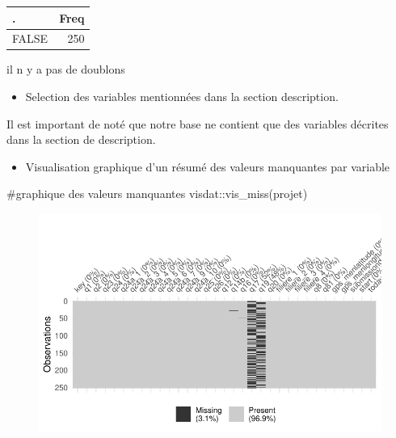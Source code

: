 \documentclass[
  letterpaper,
  DIV=11,
  numbers=noendperiod]{scrartcl}
\newenvironment{Shaded}{\begin{snugshade}}{\end{snugshade}}
\newcommand{\CommentTok}[1]{\textcolor[rgb]{0.37,0.37,0.37}{#1}}
\newcommand{\FunctionTok}[1]{\textcolor[rgb]{0.28,0.35,0.67}{#1}}
\newcommand{\NormalTok}[1]{\textcolor[rgb]{0.00,0.23,0.31}{#1}}
\newcommand{\SpecialCharTok}[1]{\textcolor[rgb]{0.37,0.37,0.37}{#1}}
\providecommand{\tightlist}{%
  \setlength{\itemsep}{0pt}\setlength{\parskip}{0pt}}\usepackage{longtable,booktabs,array}
\begin{document}
\begin{tabular}[t]{l|r}
\hline
. & Freq\\
\hline
FALSE & 250\\
\hline
\end{tabular}

il n y a pas de doublons

\begin{itemize}
\tightlist
\item
  Selection des variables mentionnées dans la section description.
\end{itemize}

Il est important de noté que notre base ne contient que des variables
décrites dans la section de description.

\begin{itemize}
\tightlist
\item
  Visualisation graphique d'un résumé des valeurs manquantes par
  variable
\end{itemize}

\begin{Shaded}
\begin{Highlighting}[]
\CommentTok{\#graphique des valeurs manquantes}
\NormalTok{visdat}\SpecialCharTok{::}\FunctionTok{vis\_miss}\NormalTok{(projet)}
\end{Highlighting}
\end{Shaded}

\begin{figure}[H]

{\centering \includegraphics{projet_R_files/figure-pdf/unnamed-chunk-6-1.pdf}

}

\end{figure}
\end{document}
